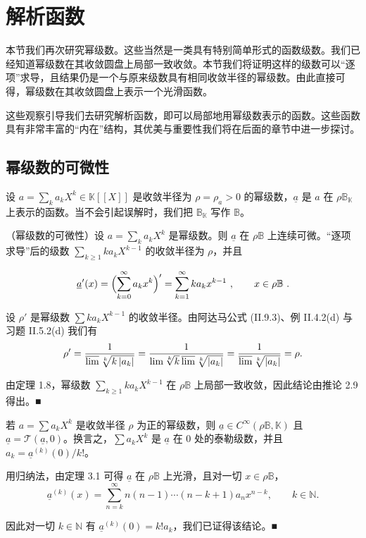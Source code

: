 \section{解析函数}

本节我们再次研究幂级数。这些当然是一类具有特别简单形式的函数级数。我们已经知道幂级数在其收敛圆盘上局部一致收敛。本节我们将证明这样的级数可以“逐项”求导，且结果仍是一个与原来级数具有相同收敛半径的幂级数。由此直接可得，幂级数在其收敛圆盘上表示一个光滑函数。

这些观察引导我们去研究解析函数，即可以局部地用幂级数表示的函数。这些函数具有非常丰富的“内在”结构，其优美与重要性我们将在后面的章节中进一步探讨。

\subsection*{幂级数的可微性}

设 $ a = \sum_k a_k X^k \in \mathbb{K}[\![X]\!] $ 是收敛半径为 $ \rho = \rho_a > 0 $ 的幂级数，$ \underline{a} $ 是 $ a $ 在 $ \rho \mathbb{B}_{\mathbb{K}} $ 上表示的函数。当不会引起误解时，我们把 $ \mathbb{B}_{\mathbb{K}} $ 写作 $ \mathbb{B} $。

\begin{theorem}

（幂级数的可微性）设 $ a = \sum_k a_k X^k $ 是幂级数。则 $ \underline{a} $ 在 $ \rho \mathbb{B} $ 上连续可微。“逐项求导”后的级数 $ \sum_{k \geq 1} ka_k X^{k-1} $ 的收敛半径为 $ \rho $，并且

\[
\underline{{a}}^{\prime}(x)=\Bigl(\sum_{k=0}^{\infty}a_{k}x^{k}\Bigr)^{\prime}=\sum_{k=1}^{\infty}k a_{k}x^{k-1}~,\qquad x\in\rho \mathbb{B}~.
\]

\proofhead
设 $ \rho' $ 是幂级数 $ \sum k a_k X^{k-1} $ 的收敛半径。由阿达马公式 (II.9.3)、例 II.4.2(d) 与习题 II.5.2(d) 我们有
\[
\rho^{\prime}=\frac{1}{\varlimsup\sqrt[k]{k\left|a_{k}\right|}}=\frac{1}{\lim\sqrt[k]{k}\varlimsup\sqrt[k]{\left|a_{k}\right|}}=\frac{1}{\varlimsup\sqrt[k]{\left|a_{k}\right|}}=\rho.
\]

由定理 1.8，幂级数 $ \sum_{k \geq 1} ka_k X^{k-1} $ 在 $ \rho\mathbb{B} $ 上局部一致收敛，因此结论由推论 2.9 得出。■

\end{theorem}

\begin{corollary}

若 $a = \sum a_k X^k$ 是收敛半径 $\rho$ 为正的幂级数，则 $\underline{a} \in C^\infty(\rho\mathbb{B},\mathbb{K})$ 且 $\underline{a} = \mathcal{T}(\underline{a},0)$。换言之，$\sum a_k X^k$ 是 $\underline{a}$ 在 0 处的泰勒级数，并且 $a_k = \underline{a}^{(k)}(0)/k!$。

\proofhead
用归纳法，由定理 3.1 可得 $ \underline{a} $ 在 $ \rho\mathbb{B} $ 上光滑，且对一切 $ x\in\rho\mathbb{B} $，
\[
\underline{{a}}^{(k)}(x)=\sum_{n=k}^{\infty}n(n-1)\cdots(n-k+1)a_{n}x^{n-k},\qquad k\in\mathbb{N}.
\]

因此对一切 $ k \in \mathbb{N} $ 有 $ \underline{a}^{(k)}(0) = k! a_k $，我们已证得该结论。■

\end{corollary}


